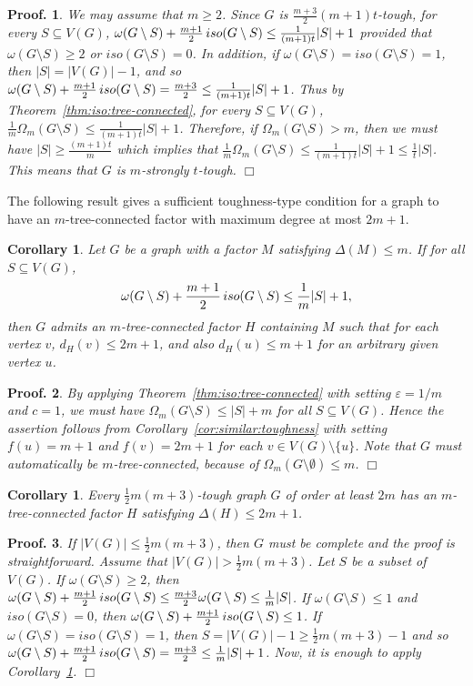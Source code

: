 \documentclass[10pt,bezier]{article}
\newtheorem{precor}[prethm]{{\bf Corollary}}
\newenvironment{cor}{\begin{precor}{\hspace{-0.5
em}{\bf.}}}{\end{precor}}
\newtheorem{preproof}{{\bf Proof.}}
\newenvironment{proof}[1]{\begin{preproof}{\rm
#1}\hfill{$\Box$}}{\end{preproof}}
\begin{document}
%
\begin{proof}
{We may assume that $m\ge 2$. 
Since $G$ is $\frac{m+3}{2}(m+1) t$-tough, for every $S\subseteq V(G)$, 
$ \omega(G\setminus S)+\small {\frac{m+1}{2}}\, iso(G\setminus S) \le \frac{1}{(m+1) t}|S|+1$ provided that
 $\omega(G\setminus S) \ge 2$ or $iso(G\setminus S) = 0$.
%
In addition, if $\omega(G\setminus S) = iso(G\setminus S) =1$, then $|S|=|V(G)|-1$, and so 
$ \omega(G\setminus S)+\small {\frac{m+1}{2}}\, iso(G\setminus S)=
\frac{m+3}{2} \le \frac{1}{ (m+1) t}|S|+1$.
%
Thus by Theorem~\ref{thm:iso:tree-connected}, 
for every $S\subseteq V(G)$,
 $ \frac{1}{m} \Omega_m(G\setminus S) \le \frac{1}{(m+1)t}|S|+1$.
Therefore, if $\Omega_m(G\setminus S) >m$, 
then we must have $|S|\ge \frac{(m+1)t}{m}$ which implies that 
$\frac{1}{m}\Omega_m(G\setminus S) \le \frac{1}{(m+1)t} |S|+1 \le \frac{1}{t} |S|$.
This means that $G$ is $m$-strongly $t$-tough.
}\end{proof}
%
The following result gives a sufficient toughness-type condition for a graph to have an $m$-tree-connected factor with maximum degree at most $2m+1$.
%
\begin{cor}\label{cor:tough+iso}
{Let $G$ be a graph with a factor $M$ satisfying $\Delta(M)\le m$. If for all $S\subseteq V(G)$, 
$$ \omega(G\setminus S)+\small {\frac{m+1}{2}}\, iso(G\setminus S) \le \frac{1}{m}|S|+1,$$
then $G$ admits an $m$-tree-connected factor $H$ containing $M$ such that for each vertex $v$, $d_H(v)\le 2m+1$,
and also $d_H(u)\le m+1$ for an arbitrary given vertex $u$.
}\end{cor}
%
\begin{proof}
{By applying Theorem~\ref{thm:iso:tree-connected} with setting $\varepsilon=1/m$ and $c =1$, we must have $ \Omega_m(G\setminus S) \le |S|+m$ for all $S\subseteq V(G)$. Hence the assertion follows from Corollary~\ref{cor:similar:toughness} with setting $f(u)=m+1$ and $f(v)=2m+1$ for each $v\in V(G)\setminus \{u\}$. Note that $G$ must automatically be $m$-tree-connected, because of $\Omega_m(G\setminus \emptyset)\le m$.
}\end{proof}
%
%
\begin{cor}\label{cor:tough-m2:verify}
{Every $\frac{1}{2}m(m+3)$-tough graph $G$ of order at least $2m$ has an $m$-tree-connected factor $H$ satisfying $\Delta(H)\le 2m+1$.
}\end{cor}
%
\begin{proof}
{If $|V(G)|\le \frac{1}{2}m(m+3)$, then $G$ must be complete and the proof is straightforward.
Assume that $|V(G)|> \frac{1}{2}m(m+3)$.
%
Let $S$ be a subset of $V(G)$.
If $\omega(G\setminus S)\ge 2$, then 
%
$ \omega(G\setminus S)+\small {\frac{m+1}{2}}\, iso(G\setminus S) \le 
\frac{m+3}{2}\omega(G\setminus S)\le \frac{1}{m}|S|$.
%
If $\omega(G\setminus S)\le 1$ and $iso(G\setminus S) = 0$, then
 $\omega(G\setminus S)+\small {\frac{m+1}{2}}\, iso(G\setminus S)\le 1$.
If $\omega(G\setminus S)= iso(G\setminus S) = 1$, then $S=|V(G)|-1\ge \frac{1}{2}m(m+3)-1$
%
and so
%
$ \omega(G\setminus S)+\small {\frac{m+1}{2}}\, iso(G\setminus S) = 
\frac{m+3}{2} \le \frac{1}{m}|S|+1$.
%
Now, it is enough to apply Corollary~\ref{cor:tough+iso}.
}\end{proof}
%
%
%
\end{document}
